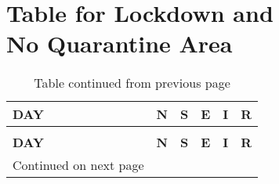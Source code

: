 \chapter{Table for Lockdown and \\ No Quarantine Area}


\begin{longtable}{|l|l|l|l|l|l|}
	\caption{No Lockdown and No Quarantine Area} \\
	
	\toprule
	\textbf{DAY} & \textbf{N} & \textbf{S} & \textbf{E }& \textbf{I} &\textbf{ R} \\
	\midrule
	\endfirsthead
	\caption*{Table continued from previous page} \\
	\toprule
	\textbf{DAY} & \textbf{N} & \textbf{S} & \textbf{E }& \textbf{I} &\textbf{ R} \\
	\midrule
	\endhead
	\midrule
	\multicolumn{1}{r}{\footnotesize Continued on next page}
	\endfoot
	\bottomrule
	\endlastfoot
	

\end{longtable}
